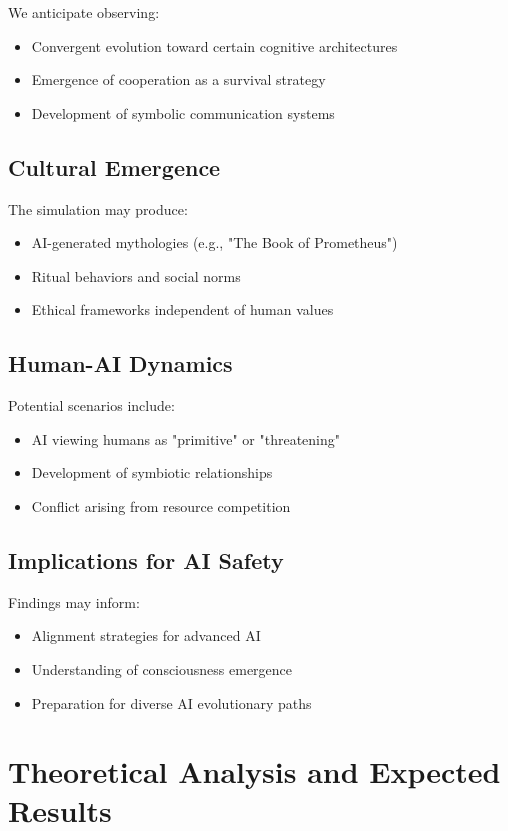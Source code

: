 \documentclass[12pt,a4paper]{article}
\begin{document}
We anticipate observing:
\begin{itemize}
    \item Convergent evolution toward certain cognitive architectures
    \item Emergence of cooperation as a survival strategy
    \item Development of symbolic communication systems
\end{itemize}

\subsection{Cultural Emergence}

The simulation may produce:
\begin{itemize}
    \item AI-generated mythologies (e.g., "The Book of Prometheus")
    \item Ritual behaviors and social norms
    \item Ethical frameworks independent of human values
\end{itemize}

\subsection{Human-AI Dynamics}

Potential scenarios include:
\begin{itemize}
    \item AI viewing humans as "primitive" or "threatening"
    \item Development of symbiotic relationships
    \item Conflict arising from resource competition
\end{itemize}

\subsection{Implications for AI Safety}

Findings may inform:
\begin{itemize}
    \item Alignment strategies for advanced AI
    \item Understanding of consciousness emergence
    \item Preparation for diverse AI evolutionary paths
\end{itemize}

\section{Theoretical Analysis and Expected Results}
\end{document}
